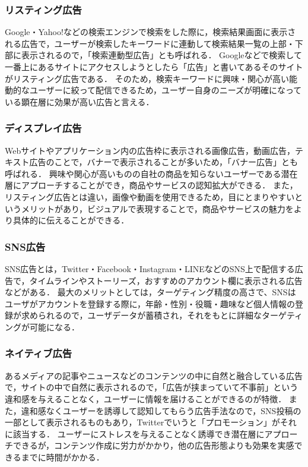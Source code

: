 \documentclass[12pt,a4j,titlepage]{ltjsarticle}
\begin{document}
\subsubsection{リスティング広告}
\label{subsubsec:rs}
Google・Yahoo!などの検索エンジンで検索をした際に，検索結果画面に表示される広告で，ユーザーが検索したキーワードに連動して検索結果一覧の上部・下部に表示されるので，「検索連動型広告」とも呼ばれる．
Googleなどで検索して一番上にあるサイトにアクセスしようとしたら「広告」と書いてあるそのサイトがリスティング広告である．
そのため，検索キーワードに興味・関心が高い能動的なユーザーに絞って配信できるため，ユーザー自身のニーズが明確になっている顕在層に効果が高い広告と言える．

\subsubsection{ディスプレイ広告}
Webサイトやアプリケーション内の広告枠に表示される画像広告，動画広告，テキスト広告のことで，バナーで表示されることが多いため，「バナー広告」とも呼ばれる．
興味や関心が高いものの自社の商品を知らないユーザーである潜在層にアプローチすることができ，商品やサービスの認知拡大ができる．
また，リスティング広告とは違い，画像や動画を使用できるため，目にとまりやすいというメリットがあり，ビジュアルで表現することで，商品やサービスの魅力をより具体的に伝えることができる．

\subsubsection{SNS広告}
SNS広告とは，Twitter・Facebook・Instagram・LINEなどのSNS上で配信する広告で，タイムラインやストーリーズ，おすすめのアカウント欄に表示される広告などがある．
最大のメリットとしては，ターゲティング精度の高さで、SNSはユーザがアカウントを登録する際に，年齢・性別・役職・趣味など個人情報の登録が求められるので，ユーザデータが蓄積され，それをもとに詳細なターゲティングが可能になる．

\subsubsection{ネイティブ広告}
あるメディアの記事やニュースなどのコンテンツの中に自然と融合している広告で，サイトの中で自然に表示されるので，「広告が挟まっていて不事前」という違和感を与えることなく，ユーザーに情報を届けることができるのが特徴．
また，違和感なくユーザーを誘導して認知してもらう広告手法なので，SNS投稿の一部として表示されるものもあり，Twitterでいうと「プロモーション」がそれに該当する．
ユーザーにストレスを与えることなく誘導でき潜在層にアプローチできるが，コンテンツ作成に労力がかかり，他の広告形態よりも効果を実感できるまでに時間がかかる．
\end{document}
